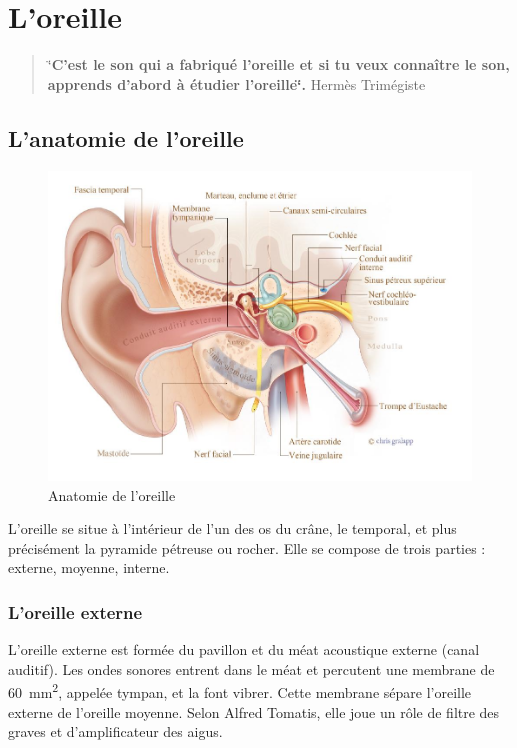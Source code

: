 \section  {L'oreille}


\begin{quotation}
	\char`\"{}\textbf{C'est le son qui a fabriqué l'oreille et si tu veux connaître
		le son, apprends d'abord à étudier l\textquoteright oreille\char`\"{}.}
	Hermès Trimégiste 
\end{quotation}

\subsection{L'anatomie de l'oreille}
\begin{figure}
	\centering
	\includegraphics[width=1\linewidth]{images/20160624Berufsfeldgruppen.jpg}
	\caption[Anatomie oreille]{Anatomie de l'oreille}
	\label{fig:-20160624berufsfeldgruppen}
\end{figure}

L'oreille\autocite[ch. 8 pp. 319--321]{marieb:biologie} 
se situe à l'intérieur de l'un des os du crâne, le temporal, et plus précisément la pyramide pétreuse ou rocher. Elle se compose de trois parties : externe, moyenne, interne.

\subsubsection{L'oreille externe}

L'oreille externe\autocite[ch. 8, pp. 319--321.]{marieb:biologie}
est formée du pavillon et du méat acoustique externe
	(canal auditif). Les ondes sonores entrent dans le méat et percutent
	une membrane de \SI{60}{\milli\metre\squared}, appelée tympan, et la font vibrer. 
	Cette membrane
	sépare l'oreille externe de l'oreille moyenne. 
	Selon Alfred Tomatis,
	elle joue un rôle de filtre des graves et d'amplificateur des aigus.




